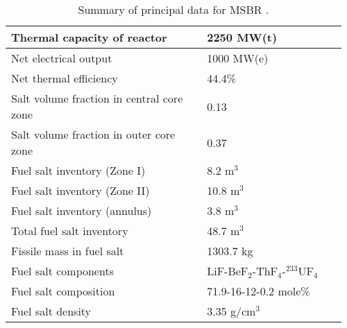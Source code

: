 \begin{table}[h!]
        \caption{Summary of principal data for MSBR \cite{robertson_conceptual_1971}.}
        \begin{tabular}{|m{0.56\linewidth} | m{0.40\linewidth}|}
        \hline
                Thermal capacity of reactor           & 2250 MW(t)
                \\ [5pt] \hline 
                Net electrical output                 & 1000 MW(e) 
                \\ [5pt] \hline 
                Net thermal efficiency        & 44.4\%
                \\ [5pt] \hline 
                Salt volume fraction in central core zone     & 0.13
                \\ [5pt] \hline 
                Salt volume fraction in outer core zone       & 0.37
                \\ [5pt] \hline 
                Fuel salt inventory (Zone I)                  & 8.2 m$^3$	
                \\ [5pt] \hline 
                Fuel salt inventory (Zone II)                 & 10.8 m$^3$	
                \\ [5pt] \hline 
                Fuel salt inventory (annulus)                 & 3.8 m$^3$	
                \\ [5pt] \hline 
                Total fuel salt inventory                     & 48.7 m$^3$	
                \\ [5pt] \hline 
                Fissile mass in fuel salt                   & 1303.7 kg	
                \\ [5pt] \hline 
                Fuel salt components                  & 
                LiF-BeF$_2$-ThF$_4$-$^{233}$UF$_4$	
                \\ [5pt] \hline 
                Fuel salt composition                 & 
                71.9-16-12-0.2 mole\%
                \\[5pt]  \hline 
                Fuel salt density                    & 
                3.35 g/cm$^3$
                \\[5pt]  \hline 
        \end{tabular}
        \label{tab:msbr_tab}
\end{table}

